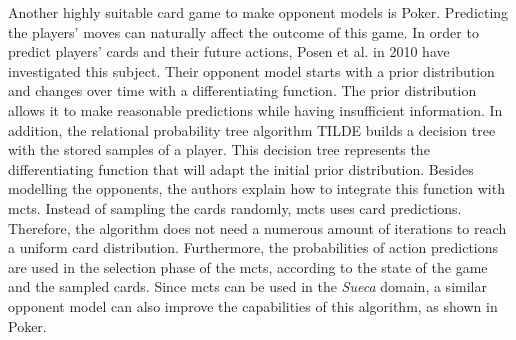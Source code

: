 Another highly suitable card game to make opponent models is Poker.
Predicting the players' moves can naturally affect the outcome of this game.
In order to predict players' cards and their future actions, Posen et al. in 2010 \cite{Ponsen2008} have investigated this subject.
Their opponent model starts with a prior distribution and changes over time with a differentiating function.
The prior distribution allows it to make reasonable predictions while having insufficient information.
In addition, the relational probability tree algorithm TILDE builds a decision tree with the stored samples of a player.
This decision tree represents the differentiating function that will adapt the initial prior distribution.
Besides modelling the opponents, the authors explain how to integrate this function with \gls{mcts}.
Instead of sampling the cards randomly, \gls{mcts} uses card predictions.
Therefore, the algorithm does not need a numerous amount of iterations to reach a uniform card distribution.
Furthermore, the probabilities of action predictions are used in the selection phase of the \gls{mcts}, according to the state of the game and the sampled cards.
Since \gls{mcts} can be used in the \emph{Sueca} domain, a similar opponent model can also improve the capabilities of this algorithm, as shown in Poker.

 